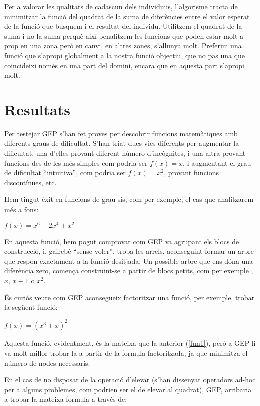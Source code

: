 Per a valorar les qualitats de cadascun dels individuus, l'algorisme tracta de
minimitzar la funció del quadrat de la suma de diferències entre el valor
esperat de la funció que busquem i el resultat del individu.  Utilitzem el
quadrat de la suma i no la suma perquè així penalitzem les funcions que poden
estar molt a prop en una zona però en canvi, en altres zones, s'allunya molt.
Preferim una funció que s'apropi globalment a la nostra funció objectiu, que no
pas una que coincideixi només en una part del domini, encara que en aquesta part
s'apropi molt.


\section{Resultats} %
\label{sec:GResultats}

Per testejar GEP s'han fet proves per descobrir funcions matemàtiques amb
diferents graus de dificultat.  S'han triat dues vies diferents per augmentar la
dificultat, una d'elles provant diferent número d'incògnites, i una altra
provant funcions des de les més simples com podria ser $f(x)=x$, i augmentant el
grau de dificultat ``intuitiva'', com podria ser $f(x)=x^2$, provant funcions
discontínues, etc.

Hem tingut èxit en funcions de grau sis, com per exemple, el cas que analitzarem
més a fons:

\begin{center}
	\label{fun1} 
	$f(x)=x^6-2x^4+x^2$
\end{center}

En aquesta funció, hem pogut comprovar com GEP va agrupant els blocs de
construcció, i, gairebé ``sense voler'', troba les arrels, aconseguint formar un
arbre que respon exactament a la funció desitjada. Un possible arbre que ens
dóna una diferència zero, comença construint-se a partir de blocs petits, com
per exemple , $x$, $x+1$ o $x^2$.


És curiós veure com GEP aconsegueix factoritzar una funció, per exemple, trobar
la següent funció:

\begin{center}
	$f(x) = (x^3 + x)^2 $
\end{center}

Aquesta funció, evidentment, és la mateixa que la anterior (\ref{fun1}), però a
GEP li va molt millor trobar-la a partir de la formula factoritzada, ja que
minimitza el número de nodes necessaris.

En el cas de no disposar de la operació d'elevar (s'han dissenyat operadors
ad-hoc per a alguns problemes, com podrien ser el de elevar al quadrat), GEP,
arribaria a trobar la mateixa formula a través de:

